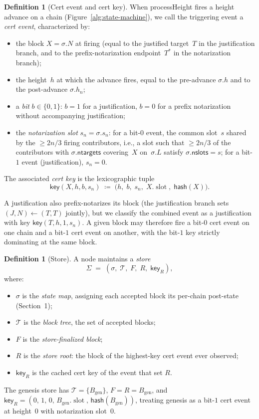 \ifx\litemode\undefined\documentclass{article}\fi
\newcommand{\genesis}{\ensuremath{B_{\mathrm{gen}}}}
\newcommand{\T}[0]{\ensuremath{\mathcal{T}}}
\newcommand{\slot}[0]{\ensuremath{\operatorname{\mathrm{slot}}}}
\newcommand{\ntargets}{\mathsf{ntargets}}
\newcommand{\nslots}{\mathsf{nslots}}
\newcommand{\hash}{\mathsf{hash}}
\newcommand{\key}{\mathsf{key}}
\newcommand{\processHeight}{\textsf{processHeight}\xspace}
\theoremstyle{plain}
\theoremstyle{definition}
\newtheorem{definition}[theorem]{Definition}
\theoremstyle{remark}
\begin{document}
\begin{definition}[Cert event and cert key]\label{def:cert-event}
When \processHeight fires a height advance on a chain (Figure~\ref{alg:state-machine}), we call the triggering event a \emph{cert event}, characterized by:
\begin{itemize}
  \item the block $X = \sigma.N$ at firing (equal to the justified target~$T$ in the justification branch, and to the prefix-notarization endpoint~$T^*$ in the notarization branch);
  \item the height~$h$ at which the advance fires, equal to the pre-advance $\sigma.h$ and to the post-advance $\sigma.h_n$;
  \item a \emph{bit} $b \in \{0, 1\}$: $b = 1$ for a justification, $b = 0$ for a prefix notarization without accompanying justification;
  \item the \emph{notarization slot} $s_n = \sigma.s_n$: for a bit-$0$ event, the common slot~$s$ shared by the $\geq 2n/3$ firing contributors, i.e., a slot such that $\geq 2n/3$ of the contributors with $\sigma.\ntargets$ covering~$X$ on~$\sigma.L$ satisfy $\sigma.\nslots = s$; for a bit-$1$ event (justification), $s_n = 0$.
\end{itemize}
The associated \emph{cert key} is the lexicographic tuple
\[
  \key(X, h, b, s_n) \;\coloneqq\; \bigl(h,\; b,\; s_n,\; X.\slot,\; \hash(X)\bigr).
\]
\end{definition}

A justification also prefix-notarizes its block (the justification branch sets $(J, N) \gets (T, T)$ jointly), but we classify the combined event as a justification with key $\key(T, h, 1, s_n)$.
A given block may therefore fire a bit-$0$ cert event on one chain and a bit-$1$ cert event on another, with the bit-$1$ key strictly dominating at the same block.

\begin{definition}[Store]\label{def:store}
A node maintains a \emph{store}
\[
  \Sigma \;=\; (\sigma,\; \T,\; F,\; R,\; \key_R),
\]
where:
\begin{itemize}
  \item $\sigma$ is the \emph{state map}, assigning each accepted block its per-chain post-state (Section~1);
  \item $\T$ is the \emph{block tree}, the set of accepted blocks;
  \item $F$ is the \emph{store-finalized block};
  \item $R$ is the \emph{store root}: the block of the highest-key cert event ever observed;
  \item $\key_R$ is the cached cert key of the event that set $R$.
\end{itemize}
The genesis store has $\T = \{\genesis\}$, $F = R = \genesis$, and $\key_R = (0,\, 1,\, 0,\, \genesis.\slot,\, \hash(\genesis))$, treating genesis as a bit-$1$ cert event at height~$0$ with notarization slot~$0$.
\end{definition}
\end{document}
